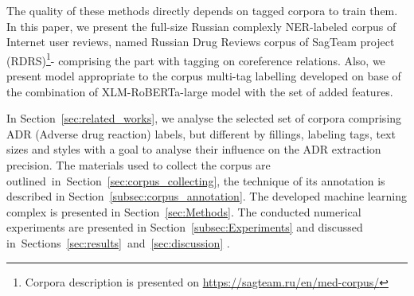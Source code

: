 \documentclass[a4paper,fleqn,longmktitle]{cas-dc}
\begin{document}
The quality of these methods directly depends on tagged corpora to train them. %
In this paper, %
we present the full-size Russian complexly NER-labeled corpus of Internet user reviews, named Russian Drug Reviews corpus of SagTeam project (RDRS)\footnote{Corpora description is presented on \url{https://sagteam.ru/en/med-corpus/} }-  comprising the part with tagging on coreference relations. 
Also, we present model appropriate to the corpus multi-tag labelling  developed on base of the combination of XLM-RoBERTa-large model with the set of added features.


 In Section~\ref{sec:related_works}, we analyse the selected set of corpora comprising ADR (Adverse drug reaction) labels, but different by  fillings, labeling tags, text sizes and styles with a goal to analyse their influence on the ADR extraction precision.
The materials used to collect the corpus are outlined~in~Section~\ref{sec:corpus_collecting}, the technique of its annotation is described in Section~\ref{subsec:corpus_annotation}. The developed machine learning complex is presented in Section~\ref{sec:Methods}. The conducted numerical experiments are presented in Section~\ref{subsec:Experiments} and discussed in~Sections~\ref{sec:results}~and~\ref{sec:discussion} .
\end{document}
